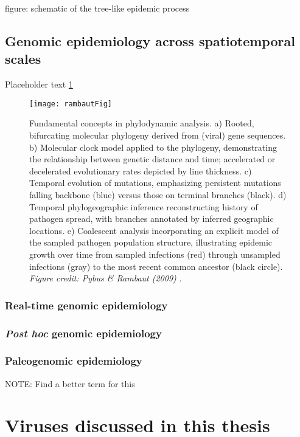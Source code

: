 
figure: schematic of the tree-like epidemic process
\subsection{Genomic epidemiology across spatiotemporal scales}
Placeholder text \ref{fig:phylogeneticsOverview}
\begin{figure}[ht]
  \centering
  \texttt{[image: rambautFig]}
  \caption[Applications of phylodynamics]{Fundamental concepts in phylodynamic analysis. a) Rooted, bifurcating molecular phylogeny derived from (viral) gene sequences. b) Molecular clock model applied to the phylogeny, demonstrating the relationship between genetic distance and time; accelerated or decelerated evolutionary rates depicted by line thickness. c) Temporal evolution of mutations, emphasizing persistent mutations falling backbone (blue) versus those on terminal branches (black). d) Temporal phylogeographic inference reconstructing history of pathogen spread, with branches annotated by inferred geographic locations. e) Coalescent analysis incorporating an explicit model of the sampled pathogen population structure, illustrating epidemic growth over time from sampled infections (red) through unsampled infections (gray) to the most recent common ancestor (black circle).
  \textit{Figure credit: Pybus \& Rambaut (2009)} \citep{pybus2009evolutionary}.
  }
  \label{fig:phylogeneticsOverview}
\end{figure}

\subsubsection{Real-time genomic epidemiology}
\subsubsection{\textit{Post hoc} genomic epidemiology}
\subsubsection{Paleogenomic epidemiology}
NOTE: Find a better term for this

  \section{Viruses discussed in this thesis}
